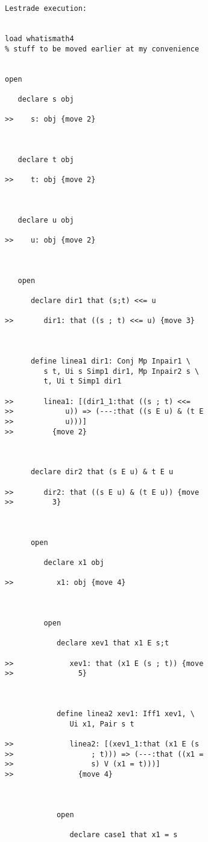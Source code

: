 \documentclass[12pt]{article}
\begin{document}
\begin{verbatim}Lestrade execution:


load whatismath4
% stuff to be moved earlier at my convenience


open

   declare s obj

>>    s: obj {move 2}



   declare t obj

>>    t: obj {move 2}



   declare u obj

>>    u: obj {move 2}



   open

      declare dir1 that (s;t) <<= u

>>       dir1: that ((s ; t) <<= u) {move 3}



      define linea1 dir1: Conj Mp Inpair1 \
         s t, Ui s Simp1 dir1, Mp Inpair2 s \
         t, Ui t Simp1 dir1

>>       linea1: [(dir1_1:that ((s ; t) <<=
>>            u)) => (---:that ((s E u) & (t E
>>            u)))]
>>         {move 2}



      declare dir2 that (s E u) & t E u

>>       dir2: that ((s E u) & (t E u)) {move
>>         3}



      open

         declare x1 obj

>>          x1: obj {move 4}



         open

            declare xev1 that x1 E s;t

>>             xev1: that (x1 E (s ; t)) {move
>>               5}



            define linea2 xev1: Iff1 xev1, \
               Ui x1, Pair s t

>>             linea2: [(xev1_1:that (x1 E (s
>>                  ; t))) => (---:that ((x1 =
>>                  s) V (x1 = t)))]
>>               {move 4}



            open

               declare case1 that x1 = s



\end{verbatim}
\end{document}

